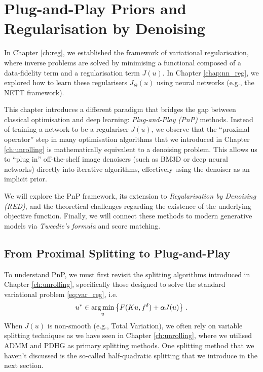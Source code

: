 \chapter{Plug-and-Play Priors and Regularisation by Denoising}
\label{ch:pnp}

In Chapter \ref{ch:reg}, we established the framework of variational regularisation, where inverse problems are solved by minimising a functional composed of a data-fidelity term and a regularisation term $J(u)$. In Chapter \ref{chap:nn_reg}, we explored how to learn these regularisers $J_\Theta(u)$ using neural networks (e.g., the NETT framework).

This chapter introduces a different paradigm that bridges the gap between classical optimisation and deep learning: \emph{Plug-and-Play (PnP)} methods. Instead of training a network to be a regulariser $J(u)$, we observe that the ``proximal operator'' step in many optimisation algorithms that we introduced in Chapter \ref{ch:unrolling} is mathematically equivalent to a denoising problem. This allows us to ``plug in'' off-the-shelf image denoisers (such as BM3D or deep neural networks) directly into iterative algorithms, effectively using the denoiser as an implicit prior.

We will explore the PnP framework, its extension to \emph{Regularisation by Denoising (RED)}, and the theoretical challenges regarding the existence of the underlying objective function. Finally, we will connect these methods to modern generative models via \emph{Tweedie's formula} and score matching.

\section{From Proximal Splitting to Plug-and-Play}
\label{sec:pnp_basics}

To understand PnP, we must first revisit the splitting algorithms introduced in Chapter \ref{ch:unrolling}, specifically those designed to solve the standard variational problem \eqref{eq:var_reg}, i.e.
\begin{align}
    u^* \in \operatorname*{arg\,min}_{u} \left\{ F(Ku, f^\delta) + \alpha J(u) \right\} \, .
    \label{eq:pnp_variational}
\end{align}
When $J(u)$ is non-smooth (e.g., Total Variation), we often rely on variable splitting techniques as we have seen in Chapter \ref{ch:unrolling}, where we utilised ADMM and PDHG as primary splitting methods. One splitting method that we haven't discussed is the so-called half-quadratic splitting that we introduce in the next section.


